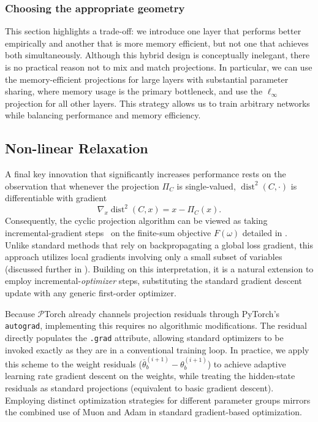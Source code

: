 \documentclass{article}
\let\cref\crtcref
\newcommand{\dist}{\operatorname{dist}}
\begin{document}
\subsubsection{Choosing the appropriate geometry}
This section highlights a trade-off: we introduce one layer that performs better empirically and another that is more memory efficient, but not one that achieves both simultaneously. Although this hybrid design is conceptually inelegant, there is no practical reason not to mix and match projections. In particular, we can use the memory-efficient projections for large layers with substantial parameter sharing, where memory usage is the primary bottleneck, and use the $\ell_\infty$ projection for all other layers. This strategy allows us to train arbitrary networks while balancing performance and memory efficiency.
\subsection{Non-linear Relaxation}
\label{sec:relaxation}
A final key innovation that significantly increases performance rests on the observation that whenever the projection $\Pi_{C}$ is single-valued, $\dist^2(C, \cdot)$ is differentiable with gradient
\[
    \nabla_x \dist^2(C, x) = x - \Pi_C(x).
\] 
Consequently, the cyclic projection algorithm can be viewed as taking incremental-gradient steps~\cite{bertsekas1997nonlinear} on the finite-sum objective $F(\omega)$ detailed in \cref{sec:math_desc}. Unlike standard methods that rely on backpropagating a global loss gradient, this approach utilizes local gradients involving only a small subset of variables (discussed further in \cref{sec:incremental-grad-descent}). Building on this interpretation, it is a natural extension to employ incremental-\textit{optimizer} steps, substituting the standard gradient descent update with any generic first-order optimizer. 

Because $\mathcal{P}$Torch already channels projection residuals through PyTorch's \texttt{autograd}, implementing this requires no algorithmic modifications. The residual directly populates the \texttt{.grad} attribute, allowing standard optimizers to be invoked exactly as they are in a conventional training loop. In practice, we apply this scheme to the weight residuals ($\bar{\theta}^{(i+1)}_b - \theta^{(i+1)}_b$) to achieve adaptive learning rate gradient descent on the weights, while treating the hidden-state residuals as standard projections (equivalent to basic gradient descent). Employing distinct optimization strategies for different parameter groups mirrors the combined use of Muon and Adam \cite{jordan2024muon} in standard gradient-based optimization.
\end{document}

